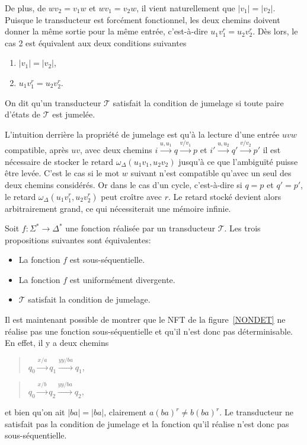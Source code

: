 	De plus, de $wv_2 = v_1w$ et $wv_1 = v_2w$, il vient naturellement que $|v_1| = |v_2|$. Puisque le transducteur est forcément fonctionnel, les deux chemins doivent donner la même sortie pour la même entrée, c'est-à-dire $u_1v_1^r = u_2v_2^r$. Dès lors, le cas 2 est équivalent aux deux conditions suivantes
	\begin{enumerate}
		\item $|v_1| = |v_2|$,
		\item $u_1v_1^r = u_2v_2^r$.
	\end{enumerate}
	On dit qu'un transducteur $\mathscr{T}$ satisfait la condition de jumelage si toute paire d'états de $\mathscr{T}$ est jumelée.
	
	L'intuition derrière la propriété de jumelage est qu'à la lecture d'une entrée $uvw$ compatible, après $uv$, avec deux chemins $i \xrightarrow{u,u_1} q \xrightarrow{v/v_1} p$ et $i' \xrightarrow{u,u_2} q' \xrightarrow{v/v_2} p'$ il est nécessaire de stocker le retard $\omega_\Delta(u_1v_1,u_2v_2)$ jusqu'à ce que l'ambiguïté puisse être levée. C'est le cas si le mot $w$ suivant n'est compatible qu'avec un seul des deux chemins considérés. Or dans le cas d'un cycle, c'est-à-dire si $q = p$ et $q' = p'$, le retard $\omega_\Delta(u_1v_1^r,u_2v_2^r)$ peut croître avec $r$. Le retard stocké devient alors arbitrairement grand, ce qui nécessiterait une mémoire infinie. \\
	
	\begin{proposition}[Choffrut]
		Soit $f : \Sigma^* \to \Delta^*$ une fonction réalisée par un transducteur $\mathscr{T}$. Les trois propositions suivantes sont équivalentes:
		\begin{itemize}
			\item La fonction $f$ est sous-séquentielle.
			\item La fonction $f$ est uniformément divergente.
			\item $\mathscr{T}$ satisfait la condition de jumelage. \\
		\end{itemize}
	\end{proposition}
	
	\begin{example}
		Il est maintenant possible de montrer que le NFT de la figure~\ref{NONDET} ne réalise pas une fonction sous-séquentielle et qu'il n'est donc pas déterminisable. En effet, il y a deux chemins
		\begin{quotation}
			$q_0 \xrightarrow{x/a} q_1 \xrightarrow{yy/ba} q_1$,
		\end{quotation}
		\begin{quotation}
			$q_0 \xrightarrow{x/b} q_2 \xrightarrow{yy/ba} q_2$,
		\end{quotation}
		et bien qu'on ait $|ba| = |ba|$, clairement $a(ba)^r \neq b(ba)^r$. Le transducteur ne satisfait pas la condition de jumelage et la fonction qu'il réalise n'est donc pas sous-séquentielle.
	\end{example}
	
